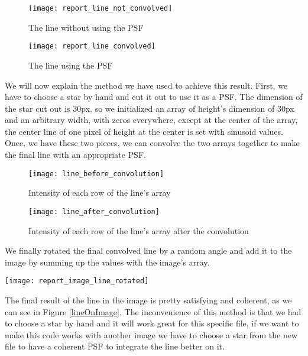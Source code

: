 \documentclass[a4paper,12pt,oneside]{report}
\begin{document}


\begin{figure}[h]
    \begin{minipage}[c]{.5\linewidth}
        \centering
        \texttt{[image: report\_line\_not\_convolved]}
        \caption{The line without using the PSF}
    \end{minipage}
    \hfill
    \begin{minipage}[c]{.5\linewidth}
        \centering
        \texttt{[image: report\_line\_convolved]}
        \caption{The line using the PSF}
    \end{minipage}
\end{figure}

We will now explain the method we have used to achieve this result. First, we have to choose a star by hand and cut it out to use it as a PSF.
The dimension of the star cut out is $30$px, so we initialized an array of height's dimension of $30$px and an arbitrary width, with zeros everywhere,
except at the center of the array, the center line of one pixel of height at the center is set with sinusoid values. Once, we have these two pieces,
we can convolve the two arrays together to make the final line with an appropriate PSF. 
\begin{figure}[h]
    \begin{minipage}[c]{.47\linewidth}
        \centering
        \texttt{[image: line\_before\_convolution]}
        \caption{Intensity of each row of the line's array}
    \end{minipage}
    \hfill
    \begin{minipage}[c]{.47\linewidth}
        \centering
        \texttt{[image: line\_after\_convolution]}
        \caption{Intensity of each row of the line's array after the convolution}
    \end{minipage}
\end{figure}
\newline
We finally rotated the final convolved line by a random angle and add it to the image by summing up the values with the image's array. 
\begin{center}
    \texttt{[image: report\_image\_line\_rotated]}
    \label{lineOnImage}
\end{center}
The final result of the line in the image is pretty satisfying and coherent, as we can see in Figure \ref{lineOnImage}.
\newline
The inconvenience of this method is that we had to choose a star by hand and it will work great for this specific file, if we want to make this code 
works with another image we have to choose a star from the new file to have a coherent PSF to integrate the line better on it.
\end{document}
